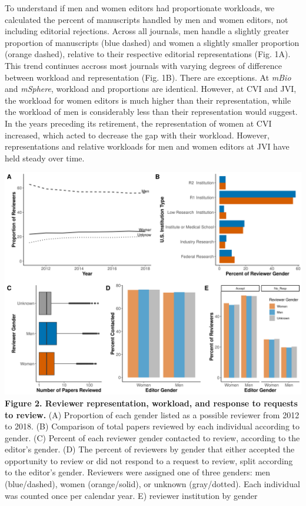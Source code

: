 \documentclass[11pt,]{article}
\begin{document}
To understand if men and women editors had proportionate workloads, we
calculated the percent of manuscripts handled by men and women editors,
not including editorial rejections. Across all journals, men handle a
slightly greater proportion of manuscripts (blue dashed) and women a
slightly smaller proportion (orange dashed), relative to their
respective editorial representations (Fig. 1A). This trend continues
accross most journals with varying degrees of difference between
workload and representation (Fig. 1B). There are exceptions. At
\emph{mBio} and \emph{mSphere}, workload and proportions are identical.
However, at CVI and JVI, the workload for women editors is much higher
than their representation, while the workload of men is considerably
less than their representation would suggest. In the years preceding its
retirement, the representation of women at CVI increased, which acted to
decrease the gap with their workload. However, representations and
relative workloads for men and women editors at JVI have held steady
over time.

\includegraphics{Figure_2.png} \textbf{Figure 2. Reviewer
representation, workload, and response to requests to review.} (A)
Proportion of each gender listed as a possible reviewer from 2012 to
2018. (B) Comparison of total papers reviewed by each individual
according to gender. (C) Percent of each reviewer gender contacted to
review, according to the editor's gender. (D) The percent of reviewers
by gender that either accepted the opportunity to review or did not
respond to a request to review, split according to the editor's gender.
Reviewers were assigned one of three genders: men (blue/dashed), women
(orange/solid), or unknown (gray/dotted). Each individual was counted
once per calendar year. E) reviewer institution by gender
\end{document}
